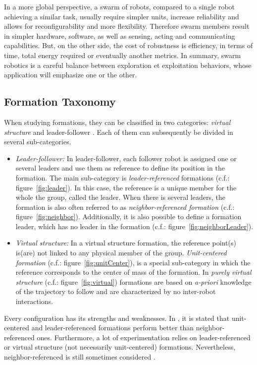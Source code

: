 \documentclass[a4paper, 12pt]{report}
\begin{document}
In a more global perspective, a swarm of robots, compared to a single robot achieving a similar task, usually require simpler units, increase reliability \cite{Beni2004} and allows for reconfigurability and more flexibility. Therefore swarm members result in simpler hardware, software, as well as sensing, acting and communicating capabilities. But, on the other side, the cost of robustness is efficiency, in terms of time, total energy required or eventually another metrics. In summary, swarm robotics is a careful balance between exploration et exploitation behaviors, whose application will emphasize one or the other.

\subsection{Formation Taxonomy}
When studying formations, they can be classified in two categories: \emph{virtual structure} and {leader-follower} \cite{Chen2005, Arkin1999}. Each of them can subsequently be divided in several sub-categories.
\begin{itemize}
\item \emph{Leader-follower:} In leader-follower, each follower robot is assigned one or several leaders and use them as reference to define its position in the formation. The main sub-category is \emph{leader-referenced} formations (c.f.: figure~\ref{fig:leader}). In this case, the reference is a unique member for the whole the group, called the leader. When there is several leaders, the formation is also often referred to as \emph{neighbor-referenced formation}  (c.f.: figure~\ref{fig:neighbor}). Additionally, it is also possible to define a formation leader, which has no leader in the formation \cite{Mataric2002} (c.f.: figure~\ref{fig:neighborLeader}).
\item \emph{Virtual structure:} In a virtual structure formation, the reference point(s) is(are) not linked to any physical member of the group. \emph{Unit-centered formation} \cite{Arkin1999} (c.f.: figure~\ref{fig:unitCenter}), is a special sub-category in which the reference corresponds to the center of mass of the formation. In \emph{purely virtual structure} (c.f.: figure~\ref{fig:virtual}) formations are based on \emph{a-priori} knowledge of the trajectory to follow and are characterized by no inter-robot interactions. 
\end{itemize}

Every configuration has its strengths and weaknesses. In \cite{Arkin1999}, it is stated that unit-centered and leader-referenced formations perform better than neighbor-referenced ones. Furthermore, a lot of experimentation relies on leader-referenced \cite{Manikonda1999,Lim2009,Fukushima2013,Shin2009, Zhao2014} or virtual structure \cite{Dunbar2002,Chao2011,Kuriki2015,Chao2012} (not necessarily unit-centered) formations. Nevertheless, neighbor-referenced is still sometimes considered \cite{Wang2007}.
\end{document}
